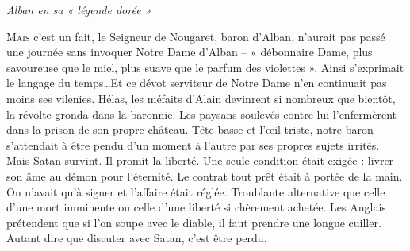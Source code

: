 \newpage

\begin{center}
    {\Large\itshape Alban en sa « légende dorée »}
\end{center}

\vspace{1.2em}

\lettrine[lines=3,lhang=0.1,nindent=0em]{M}{ais} c'est un fait, le Seigneur de Nougaret, baron d'Alban, n'aurait pas passé une journée sans invoquer Notre Dame d'Alban -- « débonnaire Dame, plus savoureuse que le miel, plus suave que le parfum des violettes ». Ainsi s'exprimait le langage du temps\ldots Et ce dévot serviteur de Notre Dame n'en continuait pas moins ses vilenies. Hélas, les méfaits d'Alain devinrent si nombreux que bientôt, la révolte gronda dans la baronnie. Les paysans soulevés contre lui l'enfermèrent dans la prison de son propre château. Tête basse et l'œil triste, notre baron s'attendait à être pendu d'un moment à l'autre par ses propres sujets irrités. Mais Satan survint. Il promit la liberté. Une seule condition était exigée : livrer son âme au démon pour l'éternité. Le contrat tout prêt était à portée de la main. On n'avait qu'à signer et l'affaire était réglée. Troublante alternative que celle d'une mort imminente ou celle d'une liberté si chèrement achetée. Les Anglais prétendent que si l'on soupe avec le diable, il faut prendre une longue cuiller. Autant dire que discuter avec Satan, c'est être perdu.
